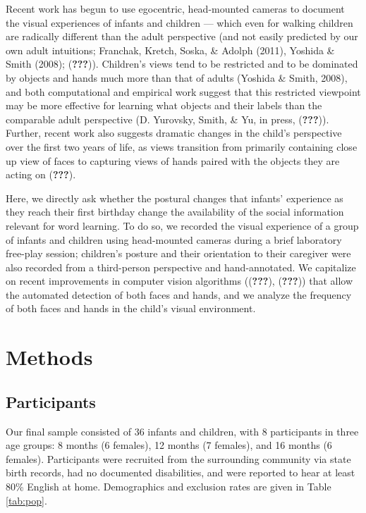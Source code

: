 \documentclass[10pt, letterpaper]{article}
\begin{document}
Recent work has begun to use egocentric, head-mounted cameras to
document the visual experiences of infants and children --- which even
for walking children are radically different than the adult perspective
(and not easily predicted by our own adult intuitions; Franchak, Kretch,
Soska, \& Adolph (2011), Yoshida \& Smith (2008); ({\textbf{???}})).
Children's views tend to be restricted and to be dominated by objects
and hands much more than that of adults (Yoshida \& Smith, 2008), and
both computational and empirical work suggest that this restricted
viewpoint may be more effective for learning what objects and their
labels than the comparable adult perspective (D. Yurovsky, Smith, \& Yu,
in press, ({\textbf{???}})). Further, recent work also suggests dramatic
changes in the child's perspective over the first two years of life, as
views transition from primarily containing close up view of faces to
capturing views of hands paired with the objects they are acting on
({\textbf{???}}).

Here, we directly ask whether the postural changes that infants'
experience as they reach their first birthday change the availability of
the social information relevant for word learning. To do so, we recorded
the visual experience of a group of infants and children using
head-mounted cameras during a brief laboratory free-play session;
children's posture and their orientation to their caregiver were also
recorded from a third-person perspective and hand-annotated. We
capitalize on recent improvements in computer vision algorithms
(({\textbf{???}}), ({\textbf{???}})) that allow the automated detection
of both faces and hands, and we analyze the frequency of both faces and
hands in the child's visual environment.

\section{Methods}\label{methods}

\subsection{Participants}\label{participants}

Our final sample consisted of 36 infants and children, with 8
participants in three age groups: 8 months (6 females), 12 months (7
females), and 16 months (6 females). Participants were recruited from
the surrounding community via state birth records, had no documented
disabilities, and were reported to hear at least 80\% English at home.
Demographics and exclusion rates are given in Table \ref{tab:pop}.
\end{document}

